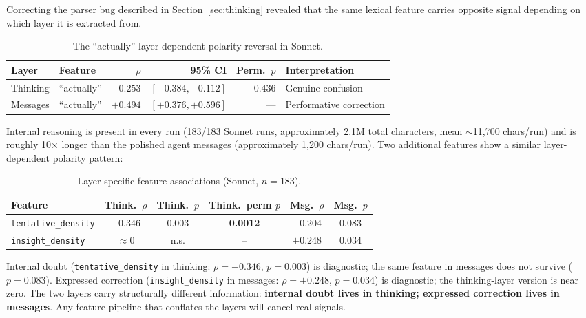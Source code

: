 \documentclass[11pt]{article}
\newcommand{\feat}[1]{\texttt{#1}}
\begin{document}
Correcting the parser bug described in Section~\ref{sec:thinking} revealed that the same lexical feature carries opposite signal depending on which layer it is extracted from.

\begin{table}[t]
\centering
\caption{The ``actually'' layer-dependent polarity reversal in Sonnet.}
\label{tab:actually}
\small
\begin{tabular}{@{}llrrrl@{}}
\toprule
\textbf{Layer} & \textbf{Feature} & \textbf{$\rho$} & \textbf{95\% CI} & \textbf{Perm.\ $p$} & \textbf{Interpretation} \\
\midrule
Thinking & ``actually'' & $-0.253$ & $[-0.384, -0.112]$ & 0.436 & Genuine confusion \\
Messages & ``actually'' & $+0.494$ & $[+0.376, +0.596]$ & --- & Performative correction \\
\bottomrule
\end{tabular}
\end{table}

Internal reasoning is present in every run (183/183 Sonnet runs, approximately 2.1M total characters, mean ${\sim}$11,700 chars/run) and is roughly 10$\times$ longer than the polished agent messages (approximately 1,200 chars/run).
Two additional features show a similar layer-dependent polarity pattern:

\begin{table}[t]
\centering
\caption{Layer-specific feature associations (Sonnet, $n = 183$).}
\label{tab:layer}
\small
\begin{tabular}{lccccc}
\toprule
\textbf{Feature} & \textbf{Think.\ $\rho$} & \textbf{Think.\ $p$} & \textbf{Think.\ perm $p$} & \textbf{Msg.\ $\rho$} & \textbf{Msg.\ $p$} \\
\midrule
\feat{tentative\_density} & $-$0.346 & 0.003 & \textbf{0.0012} & $-$0.204 & 0.083 \\
\feat{insight\_density}   & $\approx 0$ & n.s. & -- & $+$0.248 & 0.034 \\
\bottomrule
\end{tabular}
\end{table}

Internal doubt (\feat{tentative\_density} in thinking: $\rho = -0.346$, $p = 0.003$) is diagnostic; the same feature in messages does not survive ($p = 0.083$).
Expressed correction (\feat{insight\_density} in messages: $\rho = +0.248$, $p = 0.034$) is diagnostic; the thinking-layer version is near zero.
The two layers carry structurally different information: \textbf{internal doubt lives in thinking; expressed correction lives in messages}.
Any feature pipeline that conflates the layers will cancel real signals.
\end{document}
